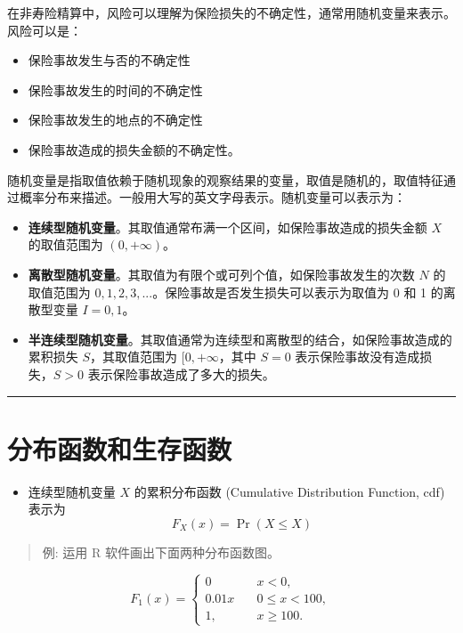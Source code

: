 \documentclass[
]{book}
\providecommand{\tightlist}{%
  \setlength{\itemsep}{0pt}\setlength{\parskip}{0pt}}
\begin{document}
在非寿险精算中，风险可以理解为保险损失的不确定性，通常用随机变量来表示。风险可以是：

\begin{itemize}
\item
  保险事故发生与否的不确定性
\item
  保险事故发生的时间的不确定性
\item
  保险事故发生的地点的不确定性
\item
  保险事故造成的损失金额的不确定性。
\end{itemize}

随机变量是指取值依赖于随机现象的观察结果的变量，取值是随机的，取值特征通过概率分布来描述。一般用大写的英文字母表示。随机变量可以表示为：

\begin{itemize}
\item
  \textbf{连续型随机变量}。其取值通常布满一个区间，如保险事故造成的损失金额 \(X\) 的取值范围为 \((0,+\infty)\)。
\item
  \textbf{离散型随机变量}。其取值为有限个或可列个值，如保险事故发生的次数 \(N\) 的取值范围为 \(0, 1, 2, 3, ...\)。保险事故是否发生损失可以表示为取值为 0 和 1 的离散型变量 \(I=0,1\)。
\item
  \textbf{半连续型随机变量}。其取值通常为连续型和离散型的结合，如保险事故造成的累积损失 \(S\)，其取值范围为 \([0, +\infty\)，其中 \(S=0\) 表示保险事故没有造成损失，\(S>0\) 表示保险事故造成了多大的损失。
\end{itemize}

\begin{center}\rule{0.5\linewidth}{0.5pt}\end{center}

\hypertarget{ux5206ux5e03ux51fdux6570ux548cux751fux5b58ux51fdux6570}{%
\section{分布函数和生存函数}\label{ux5206ux5e03ux51fdux6570ux548cux751fux5b58ux51fdux6570}}

\begin{itemize}
\tightlist
\item
  连续型随机变量 \(X\) 的累积分布函数 (Cumulative Distribution Function, cdf) 表示为 \[F_{X}(x)=\Pr(X\le X)\]
\end{itemize}

\begin{quote}
例: 运用 R 软件画出下面两种分布函数图。
\end{quote}

\begin{equation*}
F_1(x) = \begin{cases}
0 &\quad x <0,\\
0.01x & \quad 0 \le x < 100,\\
1, & \quad x\ge 100.
\end{cases}
\end{equation*}
\end{document}
